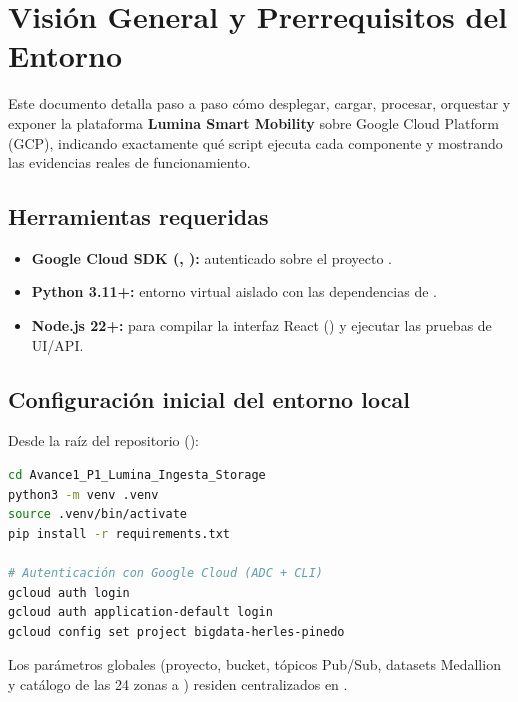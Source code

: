 \documentclass[11pt,a4paper]{article}
\begin{document}
\section{Visión General y Prerrequisitos del Entorno}

Este documento detalla paso a paso cómo desplegar, cargar, procesar, orquestar y exponer la plataforma \textbf{Lumina Smart Mobility} sobre Google Cloud Platform (GCP), indicando exactamente qué script ejecuta cada componente y mostrando las evidencias reales de funcionamiento.

\subsection{Herramientas requeridas}
\begin{itemize}[leftmargin=1.5em]
  \item \textbf{Google Cloud SDK (, ):} autenticado sobre el proyecto .
  \item \textbf{Python 3.11+:} entorno virtual aislado con las dependencias de .
  \item \textbf{Node.js 22+:} para compilar la interfaz React () y ejecutar las pruebas de UI/API.
\end{itemize}

\subsection{Configuración inicial del entorno local}
Desde la raíz del repositorio ():
\begin{lstlisting}[language=bash,caption={Preparación de entorno Python y autenticación GCP}]
cd Avance1_P1_Lumina_Ingesta_Storage
python3 -m venv .venv
source .venv/bin/activate
pip install -r requirements.txt

# Autenticación con Google Cloud (ADC + CLI)
gcloud auth login
gcloud auth application-default login
gcloud config set project bigdata-herles-pinedo
\end{lstlisting}

Los parámetros globales (proyecto, bucket, tópicos Pub/Sub, datasets Medallion y catálogo de las 24 zonas  a ) residen centralizados en .

\end{document}
